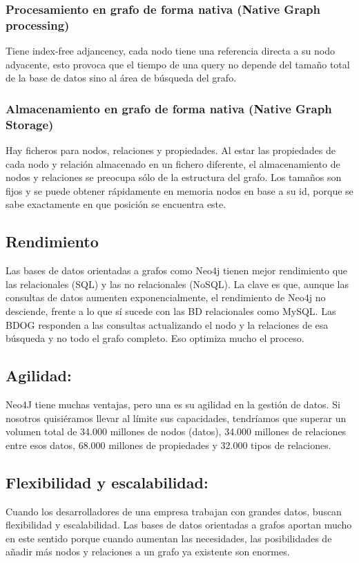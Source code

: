 \subsubsection{Procesamiento en grafo de forma nativa (Native Graph processing)}
    Tiene index-free adjancency, cada nodo tiene una referencia directa a su nodo adyacente, esto provoca    que el tiempo de una query no depende del tamaño total de la base de datos sino al área de búsqueda del grafo.\cite{20}
\subsubsection{Almacenamiento en grafo de forma nativa (Native Graph Storage)}
 	Hay ficheros para nodos, relaciones y propiedades. Al estar las propiedades de cada nodo y relación almacenado en un fichero diferente, el almacenamiento de nodos y relaciones se preocupa sólo de la estructura del grafo. Los tamaños son fijos y se puede obtener rápidamente en memoria nodos en base a su id, porque se sabe exactamente en que posición se encuentra este.\cite{21}
\newpage
 \subsection{Rendimiento}
	 Las bases de datos orientadas a grafos como Neo4j tienen mejor rendimiento que las relacionales (SQL) y las no relacionales (NoSQL). La clave es que, aunque las consultas de datos aumenten exponencialmente, el rendimiento de Neo4j no desciende, frente a lo que sí sucede con las BD relacionales como MySQL.
 	 Las BDOG responden a las consultas actualizando el nodo y la relaciones de esa búsqueda y no todo el grafo completo. Eso optimiza mucho el proceso.\cite{22}
\subsection{ Agilidad:}
	 Neo4J tiene muchas ventajas, pero una es su agilidad en la gestión de datos. Si nosotros quisiéramos llevar al límite sus capacidades, tendríamos que superar un volumen total de 34.000 millones de nodos (datos), 34.000 millones de relaciones entre esos datos, 68.000 millones de propiedades y 32.000 tipos de relaciones. \cite{23}
\subsection{Flexibilidad y escalabilidad:}
 	 Cuando los desarrolladores de una empresa trabajan con grandes datos, buscan flexibilidad y escalabilidad. Las bases de datos orientadas a grafos aportan mucho en este sentido porque cuando aumentan las necesidades, las posibilidades de añadir más nodos y relaciones a un grafo ya existente son enormes.\cite{24}
